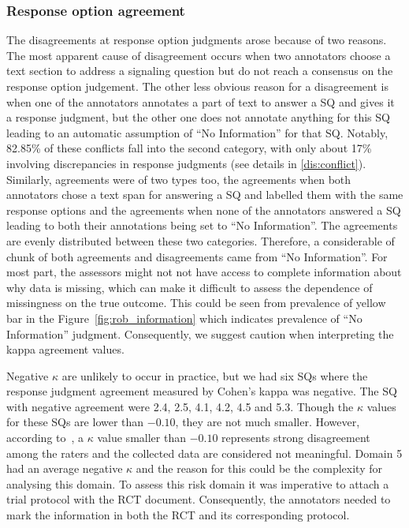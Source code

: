 \documentclass[sn-mathphys,Numbered]{sn-jnl}%
\theoremstyle{thmstyleone}%
\theoremstyle{thmstyletwo}%
\theoremstyle{thmstylethree}%
\begin{document}
\subsubsection{Response option agreement}
\label{disc:cohen}
%
The disagreements at response option judgments arose because of two reasons.
The most apparent cause of disagreement occurs when two annotators choose a text section to address a signaling question but do not reach a consensus on the response option judgement.
The other less obvious reason for a disagreement is when one of the annotators annotates a part of text to answer a SQ and gives it a response judgment, but the other one does not annotate anything for this SQ leading to an automatic assumption of ``No Information'' for that SQ.
Notably, 82.85\% of these conflicts fall into the second category, with only about 17\% involving discrepancies in response judgments (see details in \ref{dis:conflict}).
Similarly, agreements were of two types too, the agreements when both annotators chose a text span for answering a SQ and labelled them with the same response options and the agreements when none of the annotators answered a SQ leading to both their annotations being set to ``No Information''.
The agreements are evenly distributed between these two categories.
Therefore, a considerable of chunk of both agreements and disagreements came from ``No Information''.
For most part, the assessors might not not have access to complete information about why data is missing, which can make it difficult to assess the dependence of missingness on the true outcome.
This could be seen from prevalence of yellow bar in the Figure~\ref{fig:rob_information} which indicates prevalence of ``No Information'' judgment.
Consequently, we suggest caution when interpreting the kappa agreement values.


Negative $\kappa$ are unlikely to occur in practice, but we had six SQs where the response judgment agreement measured by Cohen's kappa was negative.
The SQ with negative agreement were 2.4, 2.5, 4.1, 4.2, 4.5 and 5.3.
Though the $\kappa$ values for these SQs are lower than $-0.10$, they are not much smaller.
However, according to~\cite{mchugh2012interrater}, a $\kappa$ value smaller than $-0.10$ represents strong disagreement among the raters and the collected data are considered not meaningful.
Domain 5 had an average negative $\kappa$ and the reason for this could be the complexity for analysing this domain.
To assess this risk domain it was imperative to attach a trial protocol with the RCT document.
Consequently, the annotators needed to mark the information in both the RCT and its corresponding protocol.
\end{document}
